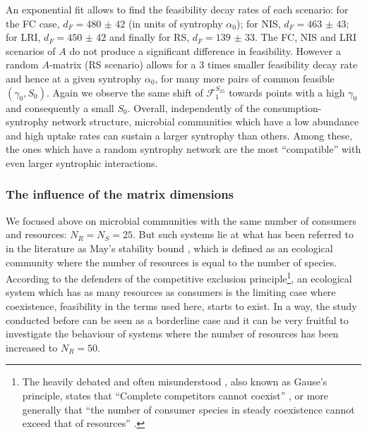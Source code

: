 \documentclass[12pt, titlepage]{report}
\begin{document}
An exponential fit %
allows to find the feasibility decay rates of each scenario: for the FC case, $d_F=\num[scientific-notation=false]{480(42)}$ (in units of syntrophy $\alpha_0$); for NIS, $d_F=\num[scientific-notation=false]{463(43)}$; for LRI, $d_F=\num[scientific-notation=false]{450(42)}$ and finally for RS, $d_F=\num[scientific-notation=false]{139(33)}$. The FC, NIS and LRI scenarios of $A$ do not produce a significant difference in feasibility. However a random $A$-matrix (RS scenario) allows for a 3 times smaller feasibility decay rate and hence at a given syntrophy $\alpha_0$, for many more pairs of common feasible $(\gamma_0, S_0)$.
Again we observe the same shift of $\mathcal{F}_1^{S_{25}}$ towards points with a high $\gamma_0$ and consequently a small $S_0$. Overall, independently of the consumption-syntrophy network structure, microbial communities which have a low abundance and high uptake rates can sustain a larger syntrophy than others. Among these, the ones which have a random syntrophy network are the most ``compatible'' with even larger syntrophic interactions.


\FloatBarrier
\subsubsection{The influence of the matrix dimensions}
We focused above on microbial communities with the same number of consumers and resources: $N_R=N_S=25$. But such systems lie at what has been referred to in the literature as May's stability bound \cite{biroli_marginally_2018}, which is defined as an ecological community where the number of resources is equal to the number of species. According to the defenders of the competitive exclusion principle\footnote{The heavily debated and often misunderstood \cite{hardin_competitive_1960} , also known as Gause's principle, states that ``Complete competitors cannot coexist'' \cite{hardin_competitive_1960}, or more generally that ``the number of consumer species in steady coexistence cannot exceed that of resources'' \cite{wang_overcome_2019}.}, an ecological system which has as many resources as consumers is the limiting case where coexistence, \ie feasibility in the terms used here, starts to exist. In a way, the study conducted before can be seen as a borderline case and it can be very fruitful to investigate the behaviour of systems where the number of resources has been increased to $N_R=50$.
\end{document}
